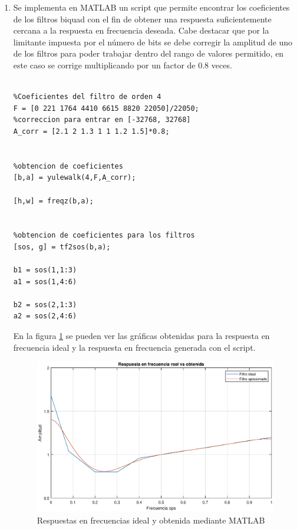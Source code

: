 \begin{enumerate}
    Finalmente resulta útil conocer como modificar la amplitud de la salida generada por el dispositivo, esto se encontró en la sección \textbf{ 10.6.1 Output Stage Volume Controls} y será relevante para el proceso que se describirá a continuación.
    
    \item Se implementa en MATLAB un script que permite encontrar los coeficientes de los filtros biquad con el fin de obtener una respuesta suficientemente cercana a la respuesta en frecuencia deseada. Cabe destacar que por la limitante impuesta por el número de bits se debe corregir la amplitud  de uno de los filtros para poder trabajar dentro del rango de valores permitido, en este caso se corrige multiplicando por un factor de 0.8 veces.

\newpage    
    \begin{lstlisting}

%Coeficientes del filtro de orden 4
F = [0 221 1764 4410 6615 8820 22050]/22050;
%correccion para entrar en [-32768, 32768]
A_corr = [2.1 2 1.3 1 1 1.2 1.5]*0.8;


%obtencion de coeficientes
[b,a] = yulewalk(4,F,A_corr);

[h,w] = freqz(b,a);


%obtencion de coeficientes para los filtros
[sos, g] = tf2sos(b,a);

b1 = sos(1,1:3)
a1 = sos(1,4:6)

b2 = sos(2,1:3)
a2 = sos(2,4:6)

\end{lstlisting}


En la figura \ref{freqz} se pueden ver las gráficas obtenidas para la respuesta en frecuencia ideal y la respuesta en frecuencia generada con el script.

\begin{figure}[H]
    \centering
    \includegraphics[scale = 0.6]{figures/freqz.eps}
    \caption{Respuestas en frecuencias ideal y obtenida mediante MATLAB}
    \label{freqz}
\end{figure}
    

\end{enumerate}
